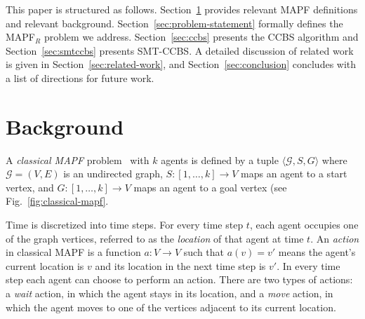 \documentclass[review]{elsarticle}
\newcommand{\target}{\ensuremath{G}\xspace}
\newcommand{\source}{\ensuremath{S}\xspace}
\newcommand\konstantin[1]{\nb{\textbf{Konstantin:}}{red}{#1}}
\newcommand\roni[1]{\nb{\textbf{Roni:}}{green}{#1}}
\newcommand\dor[1]{\nb{\textbf{Dor:}}{Fuchsia}{#1}}
\newcommand{\ccbs}{\ac{CCBS}\xspace}
\newcommand{\mapfr}{\ac{MAPF}$_R$\xspace}
\newcommand{\smtccbs}{SMT-CCBS\xspace}
\newcommand{\mapf}{\ac{MAPF}\xspace}
\newcommand{\inconflict}{\textsc{InConflict}\xspace}
\begin{document}

This paper is structured as follows. 
Section~\ref{sec:background} provides relevant \mapf definitions and relevant background. 
Section~\ref{sec:problem-statement} formally defines the \mapfr problem we address. 
Section~\ref{sec:ccbs} presents the \ccbs algorithm and Section~\ref{sec:smtccbs} presents \smtccbs. 
A detailed discussion of related work is given in Section~\ref{sec:related-work}, 
and Section~\ref{sec:conclusion} concludes with a list of directions for future work. 


\section{Background}
\label{sec:background}

A \emph{classical MAPF} problem~\cite{stern2019mapf} with $k$ agents is defined by 
a tuple $\langle \mathcal{G}, \source,\target \rangle$ 
where $\mathcal{G}=(V,E)$ is an undirected graph, 
$\source:[1,\ldots,k]\rightarrow V$ maps an agent to a start vertex, 
and $\target:[1,\ldots,k]\rightarrow V$ maps an agent to a goal vertex (see Fig.~\ref{fig:classical-mapf}.

Time is discretized into time steps. 
For every time step $t$, each agent occupies one of the graph vertices, referred to as the \emph{location} of that agent at time $t$.
An \emph{action} in classical MAPF is a function $a: V\rightarrow V$ 
such that $a(v)=v'$ means the agent's current location is $v$ and its location in the next time step is $v'$. %
In every time step each agent can choose to perform an action. 
There are two types of actions: a \emph{wait} action, in which the agent stays in its location, and a \emph{move} action, in which the agent moves to one of the vertices adjacent to its current location. 


\end{document}
